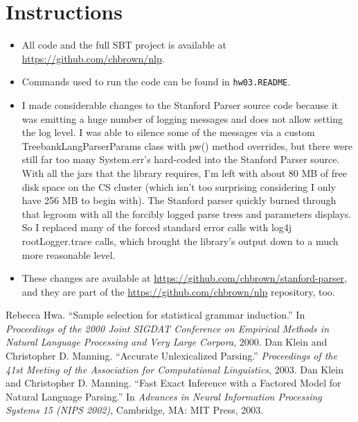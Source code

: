 \documentclass[10pt]{article}\usepackage{graphicx, color}
\begin{document}
\section{Instructions}

\begin{itemize}
  \item All code and the full SBT project is available at \url{https://github.com/chbrown/nlp}.
  \item Commands used to run the code can be found in \texttt{hw03.README}.
  \item I made considerable changes to the Stanford Parser source code because it was emitting a huge number of logging messages and does not allow setting the log level. I was able to silence some of the messages via a custom TreebankLangParserParams class with pw() method overrides, but there were still far too many System.err's hard-coded into the Stanford Parser source. With all the jars that the library requires, I'm left with about 80 MB of free disk space on the CS cluster (which isn't too surprising considering I only have 256 MB to begin with). The Stanford parser quickly burned through that legroom with all the forcibly logged parse trees and parameters displays. So I replaced many of the forced standard error calls with log4j rootLogger.trace calls, which brought the library's output down to a much more reasonable level.
  \item These changes are available at \url{https://github.com/chbrown/stanford-parser}, and they are part of the \url{https://github.com/chbrown/nlp} repository, too.
\end{itemize}

\begin{thebibliography}{20}
   Rebecca Hwa. ``Sample selection for statistical grammar induction.'' In \emph{Proceedings of the 2000 Joint SIGDAT Conference on Empirical Methods in Natural Language Processing and Very Large Corpora}, 2000.
   Dan Klein and Christopher D. Manning. ``Accurate Unlexicalized Parsing.'' \emph{Proceedings of the 41st Meeting of the Association for Computational Linguistics}, 2003.
   Dan Klein and Christopher D. Manning. ``Fast Exact Inference with a Factored Model for Natural Language Parsing.'' In \emph{Advances in Neural Information Processing Systems 15 (NIPS 2002)}, Cambridge, MA: MIT Press, 2003.
\end{thebibliography}
\end{document}
